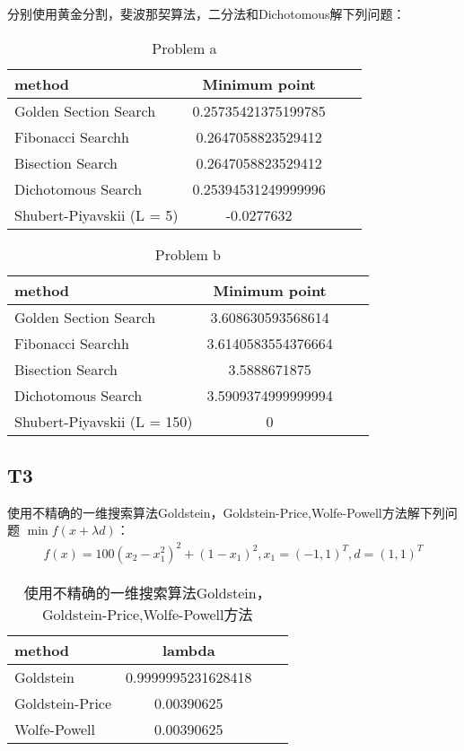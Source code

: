 \documentclass{article}
\begin{document}
    分别使用黄金分割，斐波那契算法，二分法和Dichotomous解下列问题：
    
    \begin{table}[h!]
    \centering
    \begin{tabular}{lcrp{2cm}}
        \toprule
        method  &  Minimum point  \\
        \midrule
        Golden Section Search & 0.25735421375199785 \\
        Fibonacci Searchh & 0.2647058823529412 \\
        Bisection Search & 0.2647058823529412 \\
        Dichotomous Search & 0.25394531249999996 \\
        Shubert-Piyavskii (L = 5) & -0.0277632 \\
        \bottomrule
    \end{tabular}
    \caption{Problem a}
    \end{table}


    \begin{table}[h!]
    \centering
    \begin{tabular}{lcrp{2cm}}
        \toprule
        method  &  Minimum point  \\
        \midrule
        Golden Section Search & 3.608630593568614 \\
        Fibonacci Searchh & 3.6140583554376664 \\
        Bisection Search & 3.5888671875 \\
        Dichotomous Search & 3.5909374999999994 \\
        Shubert-Piyavskii (L = 150) &  0 \\
        \bottomrule
    \end{tabular}
    \caption{Problem b}
    \end{table}
 

    \subsection*{T3}
    使用不精确的一维搜索算法Goldstein，Goldstein-Price,Wolfe-Powell方法解下列问题 $\min f(x+\lambda d)$：
    \begin{align*}
        f(x) = 100(x_2-x_1^2)^2+(1-x_1)^2, x_1 = (-1,1)^T, d=(1,1)^T 
    \end{align*}

    \begin{table}[h!]
    \centering
    \begin{tabular}{lcrp{2cm}}
        \toprule
        method  &  lambda  \\
        \midrule
        Goldstein & 0.9999995231628418 \\
        Goldstein-Price & 0.00390625 \\
        Wolfe-Powell & 0.00390625 \\
        \bottomrule
    \end{tabular}
    \caption{使用不精确的一维搜索算法Goldstein，Goldstein-Price,Wolfe-Powell方法}
    \end{table}
\end{document}
